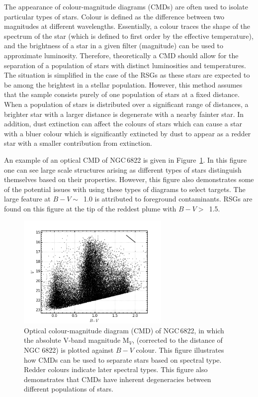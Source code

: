 {The appearance of colour-magnitude diagrams (CMDs) are often used to isolate particular types of stars.
Colour is defined as the difference between two magnitudes at different wavelengths.
Essentially, a colour traces the shape of the spectrum of the star (which is defined to first order by the effective temperature), and the brightness of a star in a given filter (magnitude) can be used to approximate luminosity.
Therefore, theoretically a CMD should allow for the separation of a population of stars with distinct luminosities and temperatures.
The situation is simplified in the case of the RSGs as these stars are expected to be among the brightest in a stellar population.
However, this method assumes that the sample consists purely of one population of stars at a fixed distance.
When a population of stars is distributed over a significant range of distances, a brighter star with a larger distance is degenerate with a nearby fainter star.
In addition, dust extinction can affect the colours of stars which can cause a star with a bluer colour which is significantly extincted by dust to appear as a redder star with a smaller contribution from extinction.

An example of an optical CMD of NGC\,6822 is given in Figure~\ref{fig:CMD}.
In this figure one can see large scale structures arising as different types of stars distinguish themselves based on their properties.
However, this figure also demonstrates some of the potential issues with using these types of diagrams to select targets.
The large feature at $B-V \sim$~1.0 is attributed to foreground contaminants.
RSGs are found on this figure at the tip of the reddest plume with $B-V >$~1.5.

\begin{figure}
 \centering
 \includegraphics[width=0.65\textwidth]{intro/NGC6822_bv_CMD}
 \caption[Optical colour-magnitude diagram of NGC\,6822]{Optical colour-magnitude diagram (CMD) of NGC\,6822, in which the absolute V-band magnitude M$_{V}$, (corrected to the distance of NGC 6822) is plotted against $B-V$ colour.
This figure illustrates how CMDs can be used to separate stars based on spectral type. Redder colours indicate later spectral types.
This figure also demonstrates that CMDs have inherent degeneracies between different populations of stars.
 \label{fig:CMD}}
\end{figure}

}
